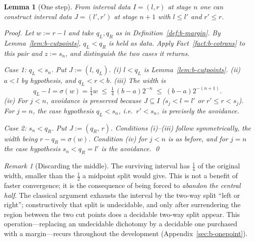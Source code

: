 \documentclass[11pt]{article}
\newtheorem{lemma}[theorem]{Lemma}
\theoremstyle{definition}
\theoremstyle{remark}
\newtheorem{remark}[theorem]{Remark}
\begin{document}
\begin{lemma}[One step]
\label{lem:b-onestep}
From interval data $I=(l,r)$ at stage $n$ one can \emph{construct} interval data $J=(l',r')$ at stage $n+1$ with $l\le l'$ and $r'\le r$.

\emph{Proof.}  Let $w:=r-l$ and take $q_L,q_R$ as in Definition~\ref{def:b-margin}.  By Lemma~\ref{lem:b-cutpoints}, $q_L<q_R$ is held as data.  Apply Fact~\ref{fact:b-cotrans} to this pair and $z:=s_n$, and distinguish the two cases it returns.

\emph{Case 1: $q_L<s_n$.}  Put $J:=(l,\,q_L)$.  (i) $l<q_L$ is Lemma~\ref{lem:b-cutpoints}.  (ii) $a<l$ by hypothesis, and $q_L<r<b$.  (iii) The width is
\[
q_L-l=\sigma(w)=\tfrac14w\;\le\;\tfrac14\,(b-a)2^{-n}\;\le\;(b-a)2^{-(n+1)} .
\]
(iv) For $j<n$, avoidance is preserved because $J\subseteq I$ ($s_j<l=l'$ or $r'\le r<s_j$).  For $j=n$, the case hypothesis $q_L<s_n$, i.e.\ $r'<s_n$, is precisely the avoidance.

\emph{Case 2: $s_n<q_R$.}  Put $J:=(q_R,\,r)$.  Conditions (i)--(iii) follow symmetrically, the width being $r-q_R=\sigma(w)$.  Condition (iv) for $j<n$ is as before, and for $j=n$ the case hypothesis $s_n<q_R=l'$ is the avoidance. \qed
\end{lemma}

\begin{remark}[Discarding the middle]
\label{rem:b-middle}
The surviving interval has $\tfrac14$ of the original width, smaller than the $\tfrac12$ a midpoint split would give.  This is not a benefit of faster convergence; it is the consequence of being forced to \emph{abandon the central half}.  The classical argument exhausts the interval by the two-way split ``left or right''; constructively that split is undecidable, and only after surrendering the region between the two cut points does a decidable two-way split appear.  This operation---replacing an undecidable dichotomy by a decidable one purchased with a margin---recurs throughout the development (Appendix~\ref{sec:b-onepoint}).
\end{remark}
\end{document}
